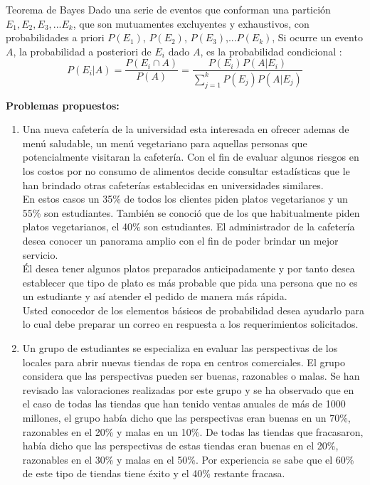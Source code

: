 \documentclass[base=hide,12pt]{elegantbook}
\begin{document}
\begin{Box2}{Teorema de  Bayes}
Dado una serie de eventos que conforman una partición $E_1, E_2, E_3,...E_k$, que son mutuamentes excluyentes y exhaustivos, con probabilidades a priori $P(E_1)$, $P(E_2)$, $P(E_3)$,...$P(E_k)$, 	 Si ocurre un evento $A$,  la probabilidad a posteriori de $E_i$ dado $A$, es la probabilidad condicional :
$$P(E_i|A) =\dfrac{P(E_i \cap A)}{P(A)} = \dfrac{P(E_i) P(A|E_i)}{\displaystyle\sum_{j=1}^{k} P(E_j)P(A|E_j)}$$
\end{Box2}

\vspace{.5cm}
\textcolor{col3}{\LARGE \bf Problemas propuestos: }\\

\begin{enumerate} 
\item Una nueva cafetería de  la universidad esta interesada en ofrecer ademas de menú saludable, un menú vegetariano para aquellas personas que potencialmente visitaran la cafetería. Con el fin de evaluar algunos riesgos en los costos por no consumo de alimentos decide consultar estadísticas que le han brindado otras cafeterías establecidas en universidades similares. \\

En estos casos un 35\% de todos los clientes piden platos vegetarianos y un 55\% son estudiantes. También se conoció que de los que habitualmente piden platos vegetarianos, el 40\% son estudiantes.
El administrador de la cafetería desea conocer un panorama amplio con el fin de poder brindar un mejor servicio.
\\
Él desea tener algunos platos preparados anticipadamente y por tanto desea establecer que tipo de plato  es más probable que pida una persona que no es un estudiante y así atender el pedido de manera más rápida.\\

Usted conocedor de los elementos básicos de probabilidad desea ayudarlo para lo cual debe preparar un correo en respuesta a los requerimientos solicitados.
\item Un grupo de estudiantes se especializa en evaluar las perspectivas de los locales para abrir nuevas tiendas de ropa en centros comerciales. El grupo considera que las  perspectivas pueden ser buenas, razonables o malas. Se han revisado las  valoraciones realizadas por este grupo y se ha observado que en el caso de todas las tiendas que han tenido ventas anuales de más de 1000 millones, el grupo había dicho que las perspectivas eran buenas en un 70\%, razonables en el 20\% y malas en un 10\%. De todas las tiendas que fracasaron, había dicho que las perspectivas de estas tiendas eran buenas en el 20\%, razonables en el 30\% y malas en el 50\%. Por experiencia se sabe que el 60\% de este tipo de tiendas tiene éxito y el 40\% restante fracasa.


\end{enumerate}
\end{document}
